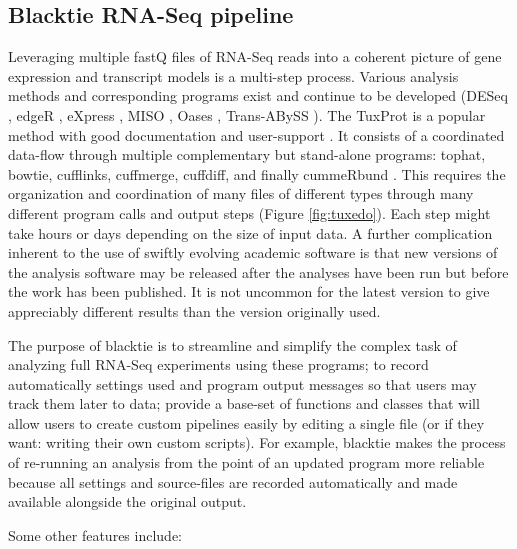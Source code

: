 \subsection{Blacktie RNA-Seq pipeline}
Leveraging multiple fastQ files of \gls{RNA-Seq} reads into a coherent picture of gene expression and transcript models is a multi-step process.
Various analysis methods and corresponding programs exist and continue to be developed (DESeq \cite{Anders2010}, edgeR \cite{Robinson2010a}, eXpress \cite{Roberts2013}, MISO \cite{Katz2010}, Oases \cite{Schulz2012}, Trans-ABySS \cite{Robertson2010}).
The \gls{TuxProt} is a popular method with good documentation and user-support \cite{Trapnell2012}.
It consists of a coordinated data-flow through multiple complementary but stand-alone programs: \gls{tophat}, \gls{bowtie}, \gls{cufflinks}, \gls{cuffmerge}, \gls{cuffdiff}, and finally \gls{cummeRbund} \cite{Kim2013,Langmead2012,Trapnell2010,Goff2012}.
This requires the organization and coordination of many files of different types through many different program calls and output steps (Figure \ref{fig:tuxedo}).
Each step might take hours or days depending on the size of input data.
A further complication inherent to the use of swiftly evolving academic software is that new versions of the analysis software may be released after the analyses have been run but before the work has been published.
It is not uncommon for the latest version to give appreciably different results than the version originally used.



The purpose of \gls{blacktie} is to streamline and simplify the complex task of analyzing full \gls{RNA-Seq} experiments using these programs; to record automatically settings used and program output messages so that users may track them later to data; provide a base-set of functions and classes that will allow users to create custom pipelines easily by editing a single file (or if they want: writing their own custom scripts).
For example, \gls{blacktie} makes the process of re-running an analysis from the point of an updated program more reliable because all settings and source-files are recorded automatically and made available alongside the original output.


Some other features include:

